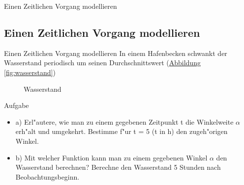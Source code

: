 \documentclass{standalone}
\begin{document}
\begin{frame}
  \begin{center}
    Einen Zeitlichen Vorgang modellieren
  \end{center}
  \subsection{Einen Zeitlichen Vorgang modellieren}
\end{frame}

\begin{frame}{Einen Zeitlichen Vorgang modellieren}
  \noindent In einem Hafenbecken schwankt der Wasserstand periodisch um seinen Durchschnittswert (\hyperref[fig:wasserstand]{Abbildung \autoref{fig:wasserstand}})

  \begin{figure}[hb!]
    \center
    \def\svgwidth{300px}
    
    \caption{Wasserstand}
    \label{fig:wasserstand}
  \end{figure}
\end{frame}


\begin{frame}{Aufgabe}
  \begin{itemize}
    \item<2-> a) Erl{"a}utere, wie man zu einem gegebenen Zeitpunkt t die Winkelweite $\alpha$ erh{"a}lt und umgekehrt. Bestimme f{"u}r t = 5 (t in h) den zugeh{"o}rigen Winkel.
    \item<3-> b) Mit welcher Funktion kann man zu einem gegebenen Winkel $\alpha$ den Wasserstand berechnen? Berechne den Wasserstand 5 Stunden nach Beobachtungsbeginn.
  \end{itemize}
\end{frame}
\end{document}
